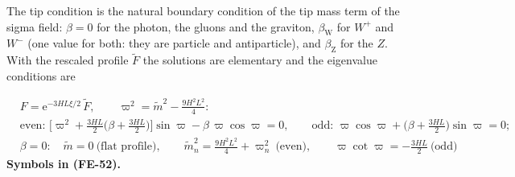 \documentclass[
  10pt,
]{article}
\begin{document}
The tip condition is the natural boundary condition of the tip mass term
of the sigma field: \(\beta = 0\) for the photon, the gluons and the
graviton, \(\beta_{\mathrm{W}}\) for \(W^+\) and \(W^-\) (one value for
both: they are particle and antiparticle), and \(\beta_{\mathrm{Z}}\)
for the \(Z\). With the rescaled profile \(\tilde F\) the solutions are
elementary and the eigenvalue conditions are

\[
\begin{aligned}
&F = \mathrm{e}^{-3HL\xi/2}\,\tilde F,\qquad \varpi^2 = \tilde m^2 - \frac{9H^2L^2}{4}:\\
&\text{even: }\Big[\varpi^2 + \frac{3HL}{2}\Big(\beta + \frac{3HL}{2}\Big)\Big]\sin\varpi -
 \beta\,\varpi\cos\varpi = 0,\qquad
 \text{odd: }\varpi\cos\varpi + \Big(\beta + \frac{3HL}{2}\Big)\sin\varpi = 0;\\
&\beta = 0:\quad \tilde m = 0\ \text{(flat profile)},\qquad \tilde m_n^2 = \frac{9H^2L^2}{4} +
 \varpi_n^2\ \text{(even)},\qquad
 \varpi\cot\varpi = -\frac{3HL}{2}\ \text{(odd)}
\end{aligned} \tag{FE-52}
\] \textbf{Symbols in (FE-52).}
\end{document}
